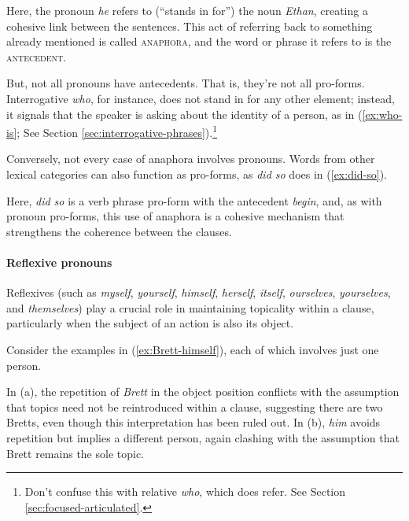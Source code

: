 Here, the pronoun \textit{he} refers to (``stands in for'') the noun \textit{Ethan}, creating a cohesive link between the sentences. This act of referring back to something already mentioned is called \textsc{anaphora}, and the word or phrase it refers to is the \textsc{antecedent}.

But, not all pronouns have antecedents. That is, they're not all pro-forms. Interrogative \textit{who}, for instance, does not stand in for any other element; instead, it signals that the speaker is asking about the identity of a person, as in (\ref{ex:who-is}; See Section \ref{sec:interrogative-phrases}).\footnote{Don't confuse this with relative \textit{who}, which does refer. See Section \ref{sec:focused-articulated}.}

\label{ex:who-is}
\z

Conversely, not every case of anaphora involves pronouns. Words from other lexical categories can also function as pro-forms, as \textit{did so} does in (\ref{ex:did-so}).

\label{ex:did-so}
\z

Here, \textit{did so} is a verb phrase pro-form with the antecedent \textit{begin}, and, as with pronoun pro-forms, this use of anaphora is a cohesive mechanism that strengthens the coherence between the clauses.

\paragraph*{Reflexive pronouns} Reflexives (such as \textit{myself}, \textit{yourself}, \textit{himself}, \textit{herself}, \textit{itself}, \textit{ourselves}, \textit{yourselves}, and \textit{themselves}) play a crucial role in maintaining topicality within a clause, particularly when the subject of an action is also its object.

Consider the examples in (\ref{ex:Brett-himself}), each of which involves just one person.

\ea\label{ex:Brett-himself}
\z
\z

In (a), the repetition of \textit{Brett} in the object position conflicts with the assumption that topics need not be reintroduced within a clause, suggesting there are two Bretts, even though this interpretation has been ruled out. In (b), \textit{him} avoids repetition but implies a different person, again clashing with the assumption that Brett remains the sole topic.

